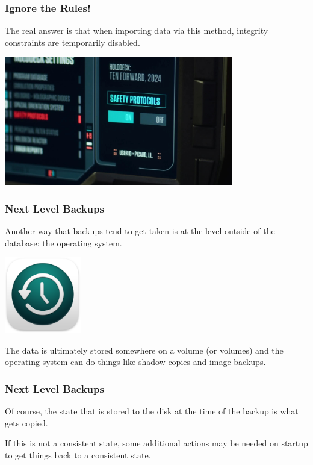 \begin{frame}
\frametitle{Ignore the Rules!}

The real answer is that when importing data via this method, integrity constraints are temporarily disabled.

\begin{center}
	\includegraphics[width=0.75\textwidth]{images/safeties.jpg}
\end{center}


\end{frame}


\begin{frame}
\frametitle{Next Level Backups}

Another way that backups tend to get taken is at the level outside of the database: the operating system. 

\begin{center}
	\includegraphics[width=0.25\textwidth]{images/timemachine.png}
\end{center}

The data is ultimately stored somewhere on a volume (or volumes) and the operating system can do things like shadow copies and image backups. 


\end{frame}


\begin{frame}
\frametitle{Next Level Backups}

Of course, the state that is stored to the disk at the time of the backup is what gets copied. 

If this is not a consistent state, some additional actions may be needed on startup to get things back to a consistent state.


\end{frame}


